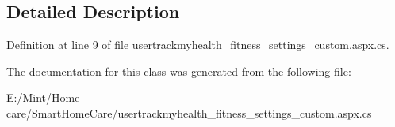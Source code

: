 \subsection{Detailed Description}


Definition at line 9 of file usertrackmyhealth\-\_\-fitness\-\_\-settings\-\_\-custom.\-aspx.\-cs.



The documentation for this class was generated from the following file\-:\begin{DoxyCompactItemize}
\item 
E\-:/\-Mint/\-Home care/\-Smart\-Home\-Care/usertrackmyhealth\-\_\-fitness\-\_\-settings\-\_\-custom.\-aspx.\-cs\end{DoxyCompactItemize}

